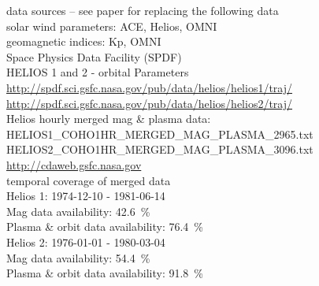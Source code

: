 


data sources -- see paper for replacing the following data\\
solar wind parameters: ACE, Helios, OMNI\\
geomagnetic indices: Kp, OMNI\\

Space Physics Data Facility (SPDF)\\

HELIOS 1 and 2 - orbital Parameters\\
\url{http://spdf.sci.gsfc.nasa.gov/pub/data/helios/helios1/traj/}\\
\url{http://spdf.sci.gsfc.nasa.gov/pub/data/helios/helios2/traj/}\\

Helios hourly merged mag \& plasma data:\\
HELIOS1\_COHO1HR\_MERGED\_MAG\_PLASMA\_2965.txt\\
HELIOS2\_COHO1HR\_MERGED\_MAG\_PLASMA\_3096.txt\\
\url{http://cdaweb.gsfc.nasa.gov}\\
temporal coverage of merged data\\
Helios 1: 1974-12-10 - 1981-06-14\\
Mag data availability: 42.6~\%\\
Plasma \& orbit data availability: 76.4~\%\\
Helios 2: 1976-01-01 - 1980-03-04\\
Mag data availability: 54.4~\%\\
Plasma \& orbit data availability: 91.8~\%\\

